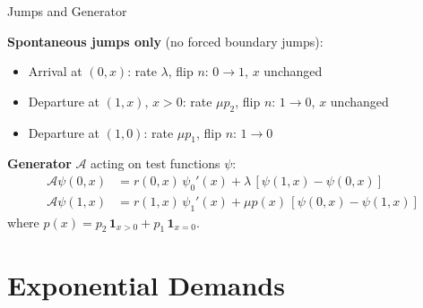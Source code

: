 \documentclass[aspectratio=169]{beamer}
\begin{document}
\begin{frame}{Jumps and Generator}

  \textbf{Spontaneous jumps only} (no forced boundary jumps):

  \medskip
  \begin{itemize}
    \setlength\itemsep{0.6em}
    \item Arrival at $(0,x)$: rate $\lambda$, flip $n\!:\, 0\to 1$, $x$ unchanged
    \item Departure at $(1,x)$, $x>0$: rate $\mu p_2$, flip $n\!:\, 1\to 0$, $x$ unchanged
    \item Departure at $(1,0)$: rate $\mu p_1$, flip $n\!:\, 1\to 0$
  \end{itemize}

  \bigskip
  \textbf{Generator} $\mathcal{A}$ acting on test functions $\psi$:
  \begin{align*}
    \mathcal{A}\psi(0,x) &= r(0,x)\,\psi_0'(x) + \lambda\,[\psi(1,x) - \psi(0,x)] \\
    \mathcal{A}\psi(1,x) &= r(1,x)\,\psi_1'(x) + \mu p(x)\,[\psi(0,x) - \psi(1,x)]
  \end{align*}
  where $p(x) = p_2\,\mathbf{1}_{x>0} + p_1\,\mathbf{1}_{x=0}$.

\end{frame}

\section{Exponential Demands}
\end{document}
